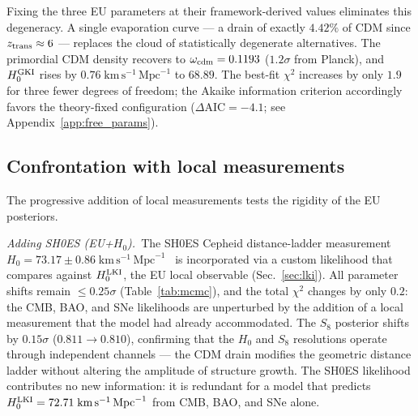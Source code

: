 \documentclass[a4paper,fleqn]{cas-dc}
\begin{document}
Fixing the three EU parameters at their framework-derived
values eliminates this degeneracy. A single evaporation
curve --- a drain of exactly $4.42\%$ of CDM since
$z_{\rm trans} \approx 6$ --- replaces the cloud of
statistically degenerate alternatives. The primordial CDM
density recovers to $\omega_{\rm cdm} = 0.1193$
($1.2\sigma$ from Planck), and $H_0^{\rm GKI}$ rises by
$0.76\;\text{km}\,\text{s}^{-1}\,\text{Mpc}^{-1}$ to $68.89$. The best-fit $\chi^2$
increases by only $1.9$ for three fewer degrees of freedom;
the Akaike information criterion accordingly favors the
theory-fixed configuration
($\Delta\text{AIC} = -4.1$; see
Appendix~\ref{app:free_params}).



\subsection{Confrontation with local measurements}
\label{sec:knockout}

The progressive addition of local measurements tests
the rigidity of the EU posteriors.

\textit{Adding SH0ES (EU+$H_0$).}~The SH0ES Cepheid
distance-ladder measurement
$H_0 = 73.17 \pm 0.86\;\text{km}\,\text{s}^{-1}\,\text{Mpc}^{-1}$~\cite{breuval2024}
is incorporated via a custom likelihood that compares
against $H_0^{\rm LKI}$, the EU local observable
(Sec.~\ref{sec:lki}). All parameter shifts remain
$\leq 0.25\sigma$ (Table~\ref{tab:mcmc}), and the total
$\chi^2$ changes by only $0.2$: the CMB, BAO, and SNe
likelihoods are unperturbed by the addition of a local
measurement that the model had already accommodated. The
$S_8$ posterior shifts by $0.15\sigma$ ($0.811 \to 0.810$),
confirming that the $H_0$ and $S_8$ resolutions operate
through independent channels --- the CDM drain modifies the
geometric distance ladder without altering the amplitude of
structure growth. The SH0ES likelihood contributes no new
information: it is redundant for a model that predicts
$H_0^{\rm LKI} = 72.71\;\text{km}\,\text{s}^{-1}\,\text{Mpc}^{-1}$ from CMB, BAO,
and SNe alone.
\end{document}
